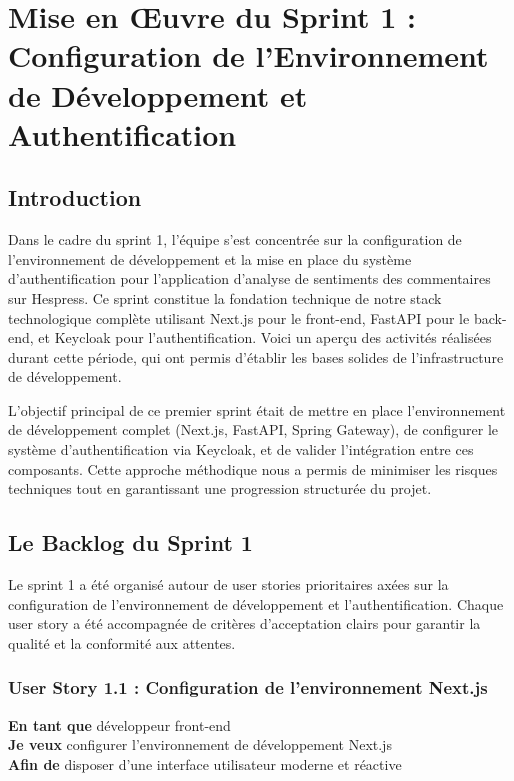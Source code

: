 \chapter{Mise en Œuvre du Sprint 1 : Configuration de l'Environnement de Développement et Authentification}

\section{Introduction}

Dans le cadre du sprint 1, l'équipe s'est concentrée sur la configuration de l'environnement de développement et la mise en place du système d'authentification pour l'application d'analyse de sentiments des commentaires sur Hespress. Ce sprint constitue la fondation technique de notre stack technologique complète utilisant Next.js pour le front-end, FastAPI pour le back-end, et Keycloak pour l'authentification. Voici un aperçu des activités réalisées durant cette période, qui ont permis d'établir les bases solides de l'infrastructure de développement.

L'objectif principal de ce premier sprint était de mettre en place l'environnement de développement complet (Next.js, FastAPI, Spring Gateway), de configurer le système d'authentification via Keycloak, et de valider l'intégration entre ces composants. Cette approche méthodique nous a permis de minimiser les risques techniques tout en garantissant une progression structurée du projet.

\section{Le Backlog du Sprint 1}

Le sprint 1 a été organisé autour de user stories prioritaires axées sur la configuration de l'environnement de développement et l'authentification. Chaque user story a été accompagnée de critères d'acceptation clairs pour garantir la qualité et la conformité aux attentes.

\subsection{User Story 1.1 : Configuration de l'environnement Next.js}

\textbf{En tant que} développeur front-end \\
\textbf{Je veux} configurer l'environnement de développement Next.js \\
\textbf{Afin de} disposer d'une interface utilisateur moderne et réactive

